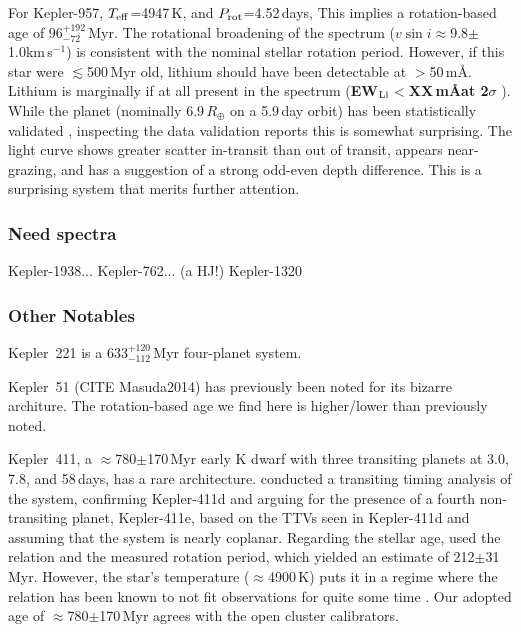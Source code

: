 \documentclass[11pt,twocolumn,tighten]{aastex63}
\newcommand{\kms}{{km\,s$^{-1}$}}
\begin{document}
For Kepler-957, $T_{\rm eff}$=4947\,K, and $P_{\rm rot}$=4.52\,days,
This implies a rotation-based age of $96_{-72}^{+192}$\,Myr.  The
rotational broadening of the spectrum ($v\sin
i$$\approx$9.8$\pm$1.0\kms) is consistent with the nominal stellar
rotation period.  However, if this star were $\lesssim$500\,Myr old,
lithium should have been detectable at $>$50\,m\AA.  Lithium is
marginally if at all present in the spectrum ({\bf  EW$_{\rm
Li}$$<$XX\,m\AA at 2$\sigma$ }).  While the planet (nominally
6.9\,$R_\oplus$ on a 5.9\,day orbit) has been statistically validated
\citep{Morton_2016}, inspecting the data validation reports this is
somewhat surprising.  The light curve shows greater scatter in-transit
than out of transit, appears near-grazing, and has a suggestion of a
strong odd-even depth difference.  This is a surprising system that
merits further attention.

\subsubsection{Need spectra}
Kepler-1938...
Kepler-762... (a HJ!)
Kepler-1320

\subsubsection{Other Notables}

Kepler~221 is a 633$^{+120}_{-112}$\,Myr four-planet system.

Kepler~51 (CITE Masuda2014) has previously been noted for its bizarre architure.
The rotation-based age we find here is higher/lower than previously noted.

Kepler~411, a $\approx$780$\pm$170\,Myr early K dwarf with three
transiting planets at 3.0, 7.8, and 58\,days, has a rare
architecture.  \citet{2019A&A...624A..15S} conducted a transiting
timing analysis of the system, confirming Kepler-411d and arguing for
the presence of a fourth non-transiting planet, Kepler-411e, based on
the TTVs seen in Kepler-411d and assuming that the system is nearly
coplanar.  Regarding the stellar age, \citet{2019A&A...624A..15S} used
the \citet{2007ApJ...669.1167B} relation and the measured rotation
period, which yielded an estimate of 212$\pm$31\,Myr.  However, the
star's temperature ($\approx$4900\,K) puts it in a regime where the
\citeauthor{2007ApJ...669.1167B} relation has been known to not fit
observations for quite some time
\citep[e.g.][Fig.~9]{2008ApJ...687.1264M}.  Our adopted age of
$\approx$780$\pm$170\,Myr agrees with the open cluster calibrators.
\end{document}
